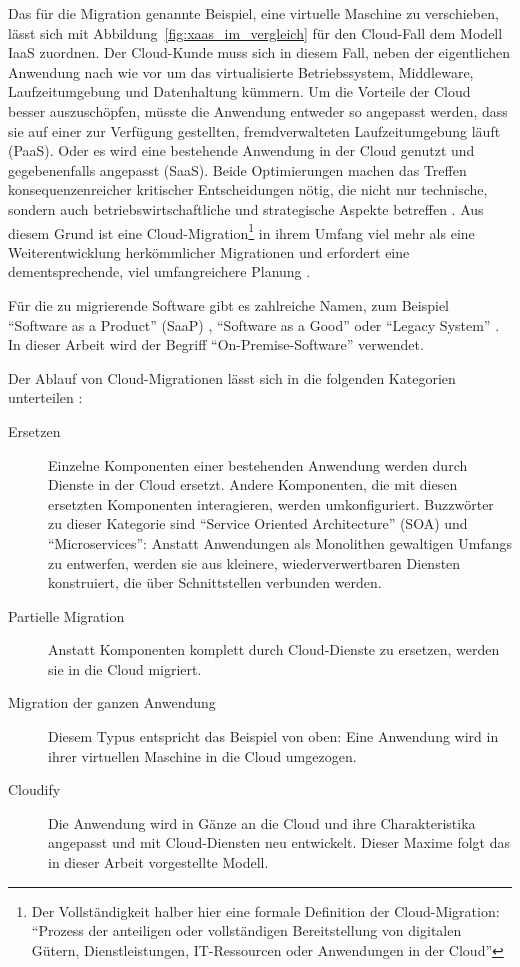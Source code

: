 Das für die Migration genannte Beispiel, eine virtuelle Maschine zu
verschieben, lässt sich mit Abbildung~\ref{fig:xaas_im_vergleich} für den
Cloud-Fall dem Modell IaaS zuordnen. Der Cloud-Kunde muss sich in diesem Fall,
neben der eigentlichen Anwendung nach wie vor um das virtualisierte
Betriebssystem, Middleware, Laufzeitumgebung und Datenhaltung kümmern. Um die
Vorteile der Cloud besser auszuschöpfen, müsste die Anwendung entweder so
angepasst werden, dass sie auf einer zur Verfügung gestellten, fremdverwalteten
Laufzeitumgebung läuft (PaaS). Oder es wird eine bestehende Anwendung in der
Cloud genutzt und gegebenenfalls angepasst (SaaS). Beide Optimierungen
machen das Treffen konsequenzenreicher kritischer Entscheidungen nötig, die 
nicht nur technische, sondern auch betriebswirtschaftliche und 
strategische Aspekte betreffen .
Aus diesem Grund ist eine Cloud-Migration\footnote{Der Vollständigkeit halber
hier eine formale Definition der Cloud-Migration: "`Prozess der anteiligen
oder
vollständigen Bereitstellung von digitalen Gütern, Dienstleistungen,
IT-Ressourcen oder Anwendungen in der Cloud"'}
 in ihrem Umfang viel mehr als eine Weiterentwicklung 
herkömmlicher Migrationen und erfordert eine dementsprechende, viel 
umfangreichere
Planung .

Für die zu migrierende Software gibt es zahlreiche Namen, zum Beispiel 
"`Software as a Product"' (SaaP) 
, "`Software as a Good"' 
 oder "`Legacy System"' 
. In dieser Arbeit wird 
der Begriff "`On-Premise-Software"' verwendet.

Der Ablauf von Cloud-Migrationen lässt sich in die folgenden Kategorien 
unterteilen : 
\begin{description}
	\item[Ersetzen] Einzelne Komponenten einer bestehenden Anwendung werden
durch Dienste in der Cloud ersetzt. Andere Komponenten, die mit diesen
ersetzten Komponenten interagieren, werden umkonfiguriert. Buzzwörter zu dieser 
Kategorie sind "`Service Oriented Architecture"' (SOA) und "`Microservices"': 
Anstatt Anwendungen als Monolithen gewaltigen Umfangs zu entwerfen, werden sie 
aus kleinere, wiederverwertbaren Diensten konstruiert, die über Schnittstellen 
verbunden werden.
	\item[Partielle Migration] Anstatt Komponenten komplett durch Cloud-Dienste zu
ersetzen, werden sie in die Cloud migriert.
	\item[Migration der ganzen Anwendung] Diesem Typus entspricht das 
Beispiel von oben: Eine Anwendung wird in ihrer virtuellen Maschine in die 
Cloud umgezogen.
	\item[Cloudify] Die Anwendung wird in Gänze an die Cloud und ihre
Charakteristika angepasst und mit Cloud-Diensten neu entwickelt. Dieser Maxime 
folgt das in dieser Arbeit vorgestellte Modell.
\end{description}

